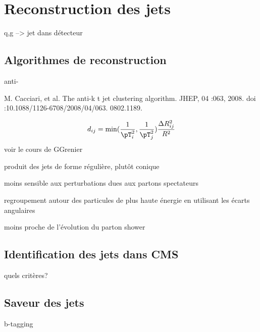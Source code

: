 \section{Reconstruction des jets}\label{chapter-JERC-section-jets_reco}

q,g --> jet dans détecteur

\subsection{Algorithmes de reconstruction}\label{chapter-JERC-section-jets_reco-subsec-algo}

anti-\kT

M. Cacciari, et al. The anti-k t jet clustering algorithm. JHEP, 04 :063, 2008.
doi :10.1088/1126-6708/2008/04/063. 0802.1189.

\begin{equation}
d_{ij} = \min(\frac{1}{\pT^2_i}, \frac{1}{\pT^2_j}) \frac{\Delta R^2_{ij}}{R^2}
\end{equation}
voir le cours de GGrenier

produit des jets de forme régulière, plutôt conique

moins sensible aux perturbations dues aux partons spectateurs

regroupement autour des particules de plus haute énergie en utilisant les écarts angulaires

moins proche de l'évolution du parton shower

\subsection{Identification des jets dans CMS}\label{chapter-JERC-section-jets_reco-subsec-jetID}
quels critères?

\subsection{Saveur des jets}\label{chapter-JERC-section-jets_reco-subsec-flavor}
b-tagging

